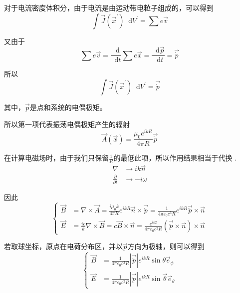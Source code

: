 \documentclass[UTF8]{ctexart}
\begin{document}
    对于电流密度体积分，由于电流是由运动带电粒子组成的，可以得到
    \begin{equation}
        \int \vec{J}(\vec{x}^{\prime}) \mathop{}\!\mathrm{d} V^{\prime} = \sum e \vec{v}
    \end{equation}

\noindent 又由于
\begin{equation}
    \sum e \vec{v} = \frac{\mathop{}\!\mathrm{d} }{\mathop{}\!\mathrm{d}  t} \sum e \vec{x} = \frac{\mathop{}\!\mathrm{d} \vec{p}}{\mathop{}\!\mathrm{d} t} =\vec{\dot{p}}
\end{equation}

\noindent 所以
\begin{equation}
    \int \vec{J}(\vec{x}^{\prime}) \mathop{}\!\mathrm{d} V^{\prime} = \vec{\dot{p}}\label{equ5.7}
\end{equation}

\noindent 其中，$\vec{p}$是点和系统的电偶极矩。

所以第一项代表振荡电偶极矩产生的辐射
\begin{equation}
    \vec{A}(\vec{x}) = \frac{\mu_0 e^{i k R}}{4 \pi R} \vec{\dot{p}}
\end{equation}

    在计算电磁场时，由于我们只保留$\frac{1}{R}$的最低此项，所以作用结果相当于代换
    .\begin{equation}
        \begin{aligned}
            \nabla & \to i k \vec{n} \\
            \frac{\partial}{\partial t} & \to - i \omega
        \end{aligned}
    \end{equation}

因此 
\begin{equation}
\left\{\begin{aligned}\vec{B}&=\nabla \times \vec{A}=\frac{i \mu_{0} k}{4 \pi R} e^{i k R} \vec{n} \times \vec{\dot{p}}=\frac{1}{4 \pi \varepsilon_0 c^{3} R} e^{i k R} \vec{\ddot{p}} \times \vec{n} \\ \vec{E}&=\frac{i c}{k} \nabla \times \vec{B}=c \vec{B} \times \vec{n}=\frac{e^{i k 2}}{4 \pi \varepsilon_0 c^{2} R}(\vec{\ddot{p}} \times \vec{n}) \times \vec{n}\end{aligned}\right. \label{equ5.14}
\end{equation}

    若取球坐标，原点在电荷分布区，并以$\vec{p}$方向为极轴，则可以得到
    \begin{equation}
    \left\{\begin{aligned}\vec{B}&=\frac{1}{4 \pi \varepsilon_{0} c^{3} R}|\vec{\ddot{p}}| e^{i k R} \sin \theta \vec{e}_{\phi} \\ \vec{E}&=\frac{1}{4 \pi \varepsilon_0 c^{2} R}|\vec{\ddot{p}}| e^{i k R} \sin \vec{\theta} \vec{e}_{\theta}\end{aligned}\right.
    \end{equation}
\end{document}

